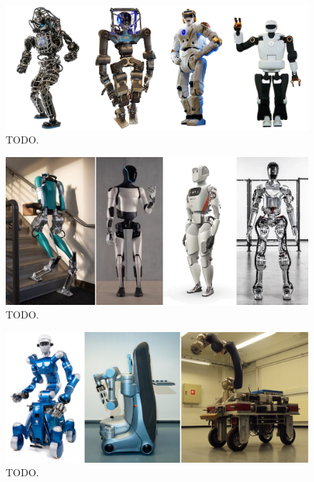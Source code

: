 \begin{figure}
    \centering
    \includegraphics[width=\textwidth]{figures/01-introduction/robots-in-2010.jpg}
    \caption{TODO.}
    \label{fig:introduction:robots-in-2010}
\end{figure}

\begin{figure}
    \centering
    \includegraphics[width=\textwidth]{figures/01-introduction/robots-in-2020.jpg}
    \caption{TODO.}
    \label{fig:introduction:robots-in-2020}
\end{figure}

\begin{figure}
    \centering
    \includegraphics[width=\textwidth]{figures/01-introduction/SWMRs-1.jpg}
    \caption{TODO.}
    \label{fig:introduction:SWMRs-1}
\end{figure}


